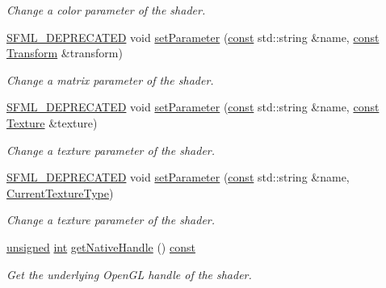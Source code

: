 \begin{DoxyCompactItemize}
\begin{DoxyCompactList}\small\item\em Change a color parameter of the shader. \end{DoxyCompactList}\item 
\hyperlink{sfml_2dep_2_s_f_m_l-2_84_82_2include_2_s_f_m_l_2_config_8hpp_a9d22ae32bba2961ae9abc7e40f035fc7}{S\-F\-M\-L\-\_\-\-D\-E\-P\-R\-E\-C\-A\-T\-E\-D} void \hyperlink{classsf_1_1_shader_a398a802fc5295ab69b0317892b0f0c75}{set\-Parameter} (\hyperlink{term__entry_8h_a57bd63ce7f9a353488880e3de6692d5a}{const} std\-::string \&name, \hyperlink{term__entry_8h_a57bd63ce7f9a353488880e3de6692d5a}{const} \hyperlink{classsf_1_1_transform}{Transform} \&transform)
\begin{DoxyCompactList}\small\item\em Change a matrix parameter of the shader. \end{DoxyCompactList}\item 
\hyperlink{sfml_2dep_2_s_f_m_l-2_84_82_2include_2_s_f_m_l_2_config_8hpp_a9d22ae32bba2961ae9abc7e40f035fc7}{S\-F\-M\-L\-\_\-\-D\-E\-P\-R\-E\-C\-A\-T\-E\-D} void \hyperlink{classsf_1_1_shader_a08c7cafd4f73ab898319c4fd7d8b5501}{set\-Parameter} (\hyperlink{term__entry_8h_a57bd63ce7f9a353488880e3de6692d5a}{const} std\-::string \&name, \hyperlink{term__entry_8h_a57bd63ce7f9a353488880e3de6692d5a}{const} \hyperlink{classsf_1_1_texture}{Texture} \&texture)
\begin{DoxyCompactList}\small\item\em Change a texture parameter of the shader. \end{DoxyCompactList}\item 
\hyperlink{sfml_2dep_2_s_f_m_l-2_84_82_2include_2_s_f_m_l_2_config_8hpp_a9d22ae32bba2961ae9abc7e40f035fc7}{S\-F\-M\-L\-\_\-\-D\-E\-P\-R\-E\-C\-A\-T\-E\-D} void \hyperlink{classsf_1_1_shader_a0fa7ecad14206e4d5edae1d6aa87f553}{set\-Parameter} (\hyperlink{term__entry_8h_a57bd63ce7f9a353488880e3de6692d5a}{const} std\-::string \&name, \hyperlink{structsf_1_1_shader_1_1_current_texture_type}{Current\-Texture\-Type})
\begin{DoxyCompactList}\small\item\em Change a texture parameter of the shader. \end{DoxyCompactList}\item 
\hyperlink{curses_8priv_8h_aca40206900cfc164654362fa8d4ad1e6}{unsigned} \hyperlink{term__entry_8h_ad65b480f8c8270356b45a9890f6499ae}{int} \hyperlink{classsf_1_1_shader_ae205f2ced4bc9198a25b44f00e81c719}{get\-Native\-Handle} () \hyperlink{term__entry_8h_a57bd63ce7f9a353488880e3de6692d5a}{const} 
\begin{DoxyCompactList}\small\item\em Get the underlying Open\-G\-L handle of the shader. \end{DoxyCompactList}\end{DoxyCompactItemize}
